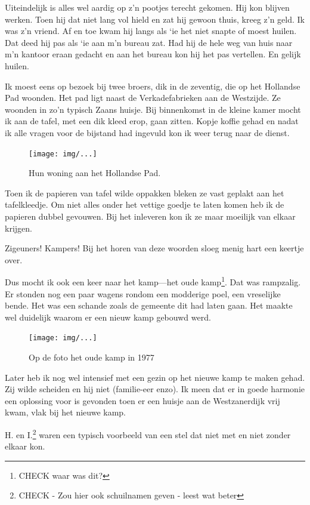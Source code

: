 \documentclass[12pt,twoside]{memoir}
\begin{document}
Uiteindelijk is alles wel aardig op z’n pootjes terecht gekomen. Hij kon blijven werken. Toen hij dat niet lang vol hield en zat hij gewoon thuis, kreeg z’n geld. Ik was z’n vriend. Af en toe kwam hij langs als `ie het niet snapte of moest huilen. Dat deed hij pas als `ie aan m’n bureau zat. Had hij de hele weg van huis naar m’n kantoor eraan gedacht en aan het bureau kon hij het pas vertellen. En gelijk huilen.

Ik moest eens op bezoek bij twee broers, dik in de zeventig, die op het Hollandse Pad woonden. Het pad ligt naast de Verkadefabrieken aan de Westzijde. Ze woonden in zo’n typisch Zaans huisje. Bij binnenkomst in de kleine kamer mocht ik aan de tafel, met een dik kleed erop, gaan zitten. Kopje koffie gehad en nadat ik alle vragen voor de bijstand had ingevuld kon ik weer terug naar de dienst. 

\begin{figure}[t]
\texttt{[image: img/...]}
\caption{Hun woning aan het Hollandse Pad.}
\end{figure}

Toen ik de papieren van tafel wilde oppakken bleken ze vast geplakt aan het tafelkleedje. Om niet alles onder het vettige goedje te laten komen heb ik de papieren dubbel gevouwen. Bij het inleveren kon ik ze maar moeilijk van elkaar krijgen.	

Zigeuners! Kampers! Bij het horen van deze woorden sloeg menig hart een keertje over. 

Dus mocht ik ook een keer naar het kamp---het oude kamp\footnote{CHECK waar was dit?}. Dat was rampzalig. Er stonden nog een paar wagens rondom een modderige poel, een vreselijke bende. Het was een schande zoals de gemeente dit had laten gaan. Het maakte wel duidelijk waarom er een nieuw kamp gebouwd werd. 

\begin{figure}[t]
\texttt{[image: img/...]}
\caption{Op de foto het oude kamp in 1977}
\end{figure}

Later heb ik nog wel intensief met een gezin op het nieuwe kamp te maken gehad. Zij wilde scheiden en hij niet (familie-eer enzo). Ik meen dat er in goede harmonie een oplossing voor is gevonden toen er een huisje aan de Westzanerdijk vrij kwam, vlak bij het nieuwe kamp. 

H. en I.\footnote{CHECK - Zou hier ook schuilnamen geven - leest wat beter} waren een typisch voorbeeld van een stel dat niet met en niet zonder elkaar kon. 
\end{document}
